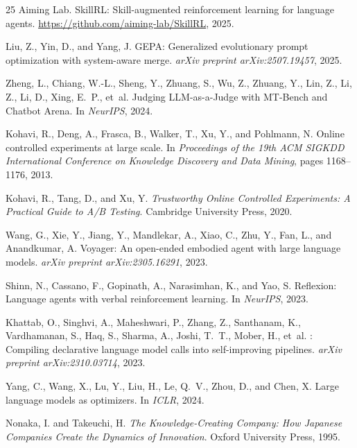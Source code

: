 \documentclass{article}
\begin{document}
\begin{thebibliography}{25}
Aiming Lab.
\newblock SkillRL: Skill-augmented reinforcement learning for language agents.
\newblock \url{https://github.com/aiming-lab/SkillRL}, 2025.

Liu, Z., Yin, D., and Yang, J.
\newblock GEPA: Generalized evolutionary prompt optimization with system-aware merge.
\newblock \emph{arXiv preprint arXiv:2507.19457}, 2025.

Zheng, L., Chiang, W.-L., Sheng, Y., Zhuang, S., Wu, Z., Zhuang, Y., Lin, Z., Li, Z., Li, D., Xing, E.~P., et~al.
\newblock Judging {LLM}-as-a-Judge with {MT}-Bench and Chatbot Arena.
\newblock In \emph{NeurIPS}, 2024.

Kohavi, R., Deng, A., Frasca, B., Walker, T., Xu, Y., and Pohlmann, N.
\newblock Online controlled experiments at large scale.
\newblock In \emph{Proceedings of the 19th ACM SIGKDD International Conference on Knowledge Discovery and Data Mining}, pages 1168--1176, 2013.

Kohavi, R., Tang, D., and Xu, Y.
\newblock \emph{Trustworthy Online Controlled Experiments: A Practical Guide to A/B Testing}.
\newblock Cambridge University Press, 2020.

Wang, G., Xie, Y., Jiang, Y., Mandlekar, A., Xiao, C., Zhu, Y., Fan, L., and Anandkumar, A.
\newblock Voyager: An open-ended embodied agent with large language models.
\newblock \emph{arXiv preprint arXiv:2305.16291}, 2023.

Shinn, N., Cassano, F., Gopinath, A., Narasimhan, K., and Yao, S.
\newblock Reflexion: Language agents with verbal reinforcement learning.
\newblock In \emph{NeurIPS}, 2023.

Khattab, O., Singhvi, A., Maheshwari, P., Zhang, Z., Santhanam, K., Vardhamanan, S., Haq, S., Sharma, A., Joshi, T.~T., Mober, H., et~al.
: Compiling declarative language model calls into self-improving pipelines.
\newblock \emph{arXiv preprint arXiv:2310.03714}, 2023.

Yang, C., Wang, X., Lu, Y., Liu, H., Le, Q.~V., Zhou, D., and Chen, X.
\newblock Large language models as optimizers.
\newblock In \emph{ICLR}, 2024.

Nonaka, I. and Takeuchi, H.
\newblock \emph{The Knowledge-Creating Company: How Japanese Companies Create the Dynamics of Innovation}.
\newblock Oxford University Press, 1995.


\end{thebibliography}
\end{document}
